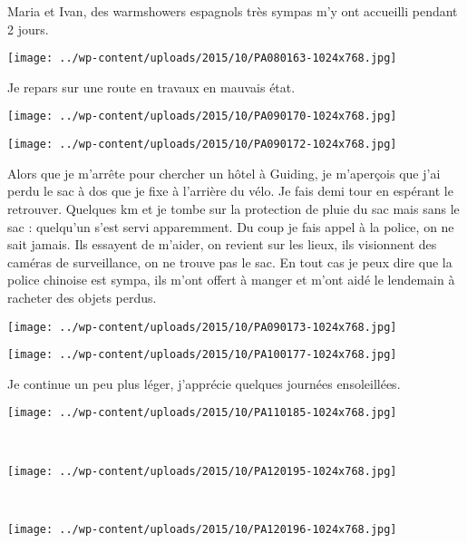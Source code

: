  Maria et Ivan, des warmshowers espagnols très sympas m'y ont accueilli pendant 2 jours. 
\begin{center} \texttt{[image: ../wp-content/uploads/2015/10/PA080163-1024x768.jpg]} \end{center}

 Je repars sur une route en travaux en mauvais état. 
\begin{center} \texttt{[image: ../wp-content/uploads/2015/10/PA090170-1024x768.jpg]} \end{center}
\begin{center} \texttt{[image: ../wp-content/uploads/2015/10/PA090172-1024x768.jpg]} \end{center}

 Alors que je m'arrête pour chercher un hôtel à Guiding, je m'aperçois que j'ai perdu le sac à dos que je fixe à l'arrière du vélo. Je fais demi tour en espérant le retrouver. Quelques km et je tombe sur la protection de pluie du sac mais sans le sac : quelqu'un s'est servi apparemment. 
 Du coup je fais appel à la police, on ne sait jamais. Ils essayent de m'aider, on revient sur les lieux, ils visionnent des caméras de surveillance, on ne trouve pas le sac. En tout cas je peux dire que la police chinoise est sympa, ils m'ont offert à manger et m'ont aidé le lendemain à racheter des objets perdus. 
\begin{center} \texttt{[image: ../wp-content/uploads/2015/10/PA090173-1024x768.jpg]} \end{center}
\begin{center} \texttt{[image: ../wp-content/uploads/2015/10/PA100177-1024x768.jpg]} \end{center}

 Je continue un peu plus léger, j'apprécie quelques journées ensoleillées. 
\begin{center} \texttt{[image: ../wp-content/uploads/2015/10/PA110185-1024x768.jpg]} \end{center}
\vspace{-\topsep}
\pagebreak

~
\vspace{0.5mm}
\begin{center} \texttt{[image: ../wp-content/uploads/2015/10/PA120195-1024x768.jpg]} \end{center}
~
\begin{center} \texttt{[image: ../wp-content/uploads/2015/10/PA120196-1024x768.jpg]} \end{center}
\vspace{-\topsep}
\pagebreak
 
